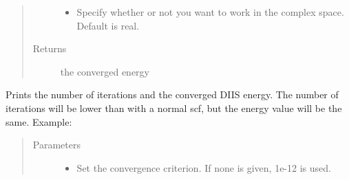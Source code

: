 \documentclass[letterpaper,10pt,english]{sphinxmanual}
\begin{document}
\begin{fulllineitems}
\begin{fulllineitems}
\begin{quote}
\begin{description}
\begin{itemize}
\item {} 
 \textendash{} Specify whether or not you want to work in the complex space. Default is real.

\end{itemize}

\item[{Returns}] \leavevmode
the converged energy

\end{description}\end{quote}

\end{fulllineitems}


\begin{fulllineitems}
\label{\detokenize{RHF:ghf.RHF.RHF.get_scf_solution_diis}}
Prints the number of iterations and the converged DIIS energy. The number of iterations will be lower than with
a normal scf, but the energy value will be the same. Example:

\begin{sphinxVerbatim}[commandchars=\\\{\}]
       
   
\end{sphinxVerbatim}
\begin{quote}\begin{description}
\item[{Parameters}] \leavevmode\begin{itemize}
\item {} 
 \textendash{} Set the convergence criterion. If none is given, 1e-12 is used.


\end{itemize}
\end{description}
\end{quote}
\end{fulllineitems}
\end{fulllineitems}
\end{document}
